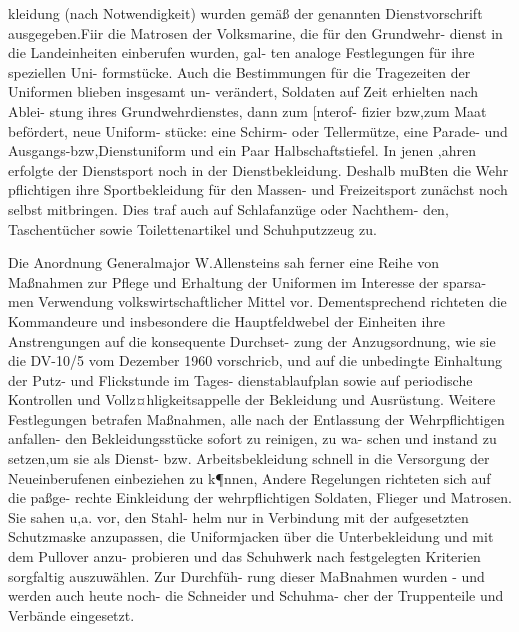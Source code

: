 kleidung (nach Notwendigkeit) wurden gemäß der
genannten Dienstvorschrift ausgegeben.Fiir die
Matrosen der Volksmarine, die für den Grundwehr-
dienst in die Landeinheiten einberufen wurden, gal-
ten analoge Festlegungen für ihre speziellen Uni-
formstücke. Auch die Bestimmungen für die
Tragezeiten der Uniformen blieben insgesamt un-
verändert, Soldaten auf Zeit erhielten nach Ablei-
stung ihres Grundwehrdienstes, dann zum [nterof-
fizier bzw,zum Maat befördert, neue Uniform-
stücke: eine Schirm- oder Tellermütze, eine Parade-
und Ausgangs-bzw,Dienstuniform und ein Paar
Halbschaftstiefel.
In jenen ,ahren erfolgte der Dienstsport noch in
der Dienstbekleidung. Deshalb muBten die Wehr
pflichtigen ihre Sportbekleidung für den Massen-
und Freizeitsport zunächst noch selbst mitbringen.
Dies traf auch auf Schlafanzüge oder Nachthem-
den, Taschentücher sowie Toilettenartikel und
Schuhputzzeug zu.

Die Anordnung Generalmajor W.Allensteins sah
ferner eine Reihe von Maßnahmen zur Pflege und
Erhaltung der Uniformen im Interesse der sparsa-
men Verwendung volkswirtschaftlicher Mittel vor.
Dementsprechend richteten die Kommandeure und
insbesondere die Hauptfeldwebel der Einheiten
ihre Anstrengungen auf die konsequente Durchset-
zung der Anzugsordnung, wie sie die DV-10/5 vom
Dezember 1960 vorschricb, und auf die unbedingte
Einhaltung der Putz- und Flickstunde im Tages-
dienstablaufplan sowie auf periodische Kontrollen
und Vollz¤hligkeitsappelle der Bekleidung und
Ausrüstung.
Weitere Festlegungen betrafen Maßnahmen, alle
nach der Entlassung der Wehrpflichtigen anfallen-
den Bekleidungsstücke sofort zu reinigen, zu wa-
schen und instand zu setzen,um sie als Dienst-
bzw. Arbeitsbekleidung schnell in die Versorgung
der Neueinberufenen einbeziehen zu k¶nnen,
Andere Regelungen richteten sich auf die paßge-
rechte Einkleidung der wehrpflichtigen Soldaten,
Flieger und Matrosen. Sie sahen u,a. vor, den Stahl-
helm nur in Verbindung mit der aufgesetzten Schutzmaske anzupassen, die Uniformjacken über
die Unterbekleidung und mit dem Pullover anzu-
probieren und das Schuhwerk nach festgelegten
Kriterien sorgfaltig auszuwählen. Zur Durchfüh-
rung dieser MaBnahmen wurden - und werden
auch heute noch- die Schneider und Schuhma-
cher der Truppenteile und Verbände eingesetzt.